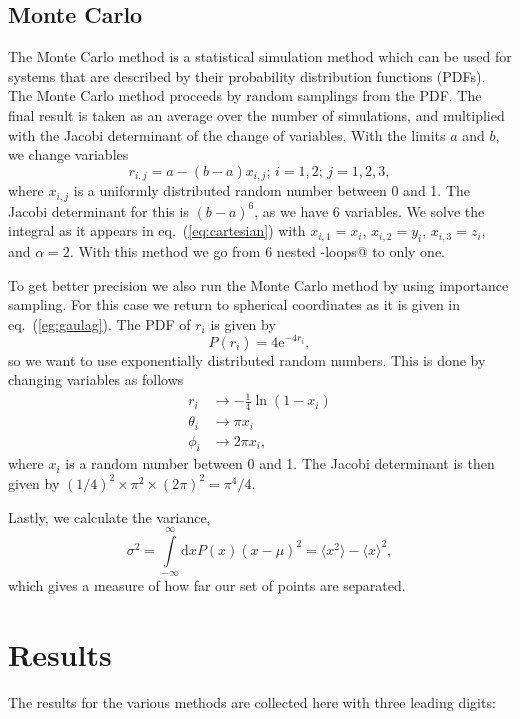 \documentclass{article}
\begin{document}
\begin{multicols}{2}
\subsection{Monte Carlo}
The Monte Carlo method is a statistical simulation method which can be used for systems that are described by their probability distribution functions (PDFs). The Monte Carlo method proceeds by random samplings from the PDF. The final result is taken as an average over the number of simulations, and multiplied with the Jacobi determinant of the change of variables. With the limits $a$ and $b$, we change variables 
\begin{equation}
	r_{i,j} = a - (b-a)x_{i,j};\,i=1,2;\,j=1,2,3,
\end{equation}
where $x_{i,j}$ is a uniformly distributed random number between 0 and 1.
The Jacobi determinant for this is $(b-a)^6$, as we have 6 variables.
We solve the integral as it appears in eq.~(\ref{eq:cartesian}) with $x_{i,1} = x_i$, $x_{i,2} = y_i$, $x_{i,3} = z_i$, and $\alpha=2$. With this method we go from 6 nested \verb@for-loops@ to only one.

To get better precision we also run the Monte Carlo method by using importance sampling. For this case we return to spherical coordinates as it is given in eq.~(\ref{eg:gaulag}). The PDF of $r_i$ is given by
\begin{equation}
	P(r_i)=4\mathrm{e}^{-4r_i},
\end{equation}
so we want to use exponentially distributed random numbers. This is done by changing variables as follows
\begin{align*}
	r_i &\rightarrow -\frac{1}{4}\ln(1-x_i) \\
	\theta_i &\rightarrow \pi x_i \\
	\phi_i &\rightarrow 2\pi x_i,
\end{align*}
where $x_i$ is a random number between 0 and 1.
The Jacobi determinant is then given by $(1/4)^2\times\pi^2\times(2\pi)^2 = \pi^4/4$.

Lastly, we calculate the variance, 
\begin{equation}\label{eq:variance}
	\sigma^2 = \int\limits_{-\infty}^{\infty}\mathrm{d}xP(x)(x-\mu)^2 = \langle x^2\rangle-\langle x\rangle^2,
\end{equation}
which gives a measure of how far our set of points are separated.


\section{Results}
The results for the various methods are collected here with three leading digits:


\end{multicols}
\end{document}
